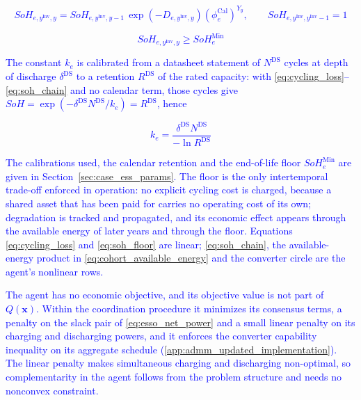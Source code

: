 \documentclass[preprint,12pt]{elsarticle}
\begin{document}
\textcolor{blue}{
    \begin{equation}
        SoH_{e,y^\text{Inv},y} = SoH_{e,y^\text{Inv},y-1} \, \exp\!\left(-D_{e,y^\text{Inv},y}\right)
        \left(\phi^{\text{Cal}}_e\right)^{Y_y},
        \qquad SoH_{e,y^\text{Inv},y^\text{Inv}-1} = 1
        \label{eq:soh_chain}
    \end{equation}
}

\textcolor{blue}{
    \begin{equation}
        SoH_{e,y^\text{Inv},y} \ge SoH^{\text{Min}}_e
        \label{eq:soh_floor}
    \end{equation}
}

\textcolor{blue}{The constant $k_e$ is calibrated from a datasheet statement of $N^{\text{DS}}$ cycles at depth of discharge $\delta^{\text{DS}}$ to a retention $R^{\text{DS}}$ of the rated capacity: with \eqref{eq:cycling_loss}--\eqref{eq:soh_chain} and no calendar term, those cycles give $SoH = \exp(-\delta^{\text{DS}} N^{\text{DS}} / k_e) = R^{\text{DS}}$, hence}

\textcolor{blue}{
    \begin{equation}
        k_e = \frac{\delta^{\text{DS}} N^{\text{DS}}}{-\ln R^{\text{DS}}}
        \label{eq:cycle_life_calibration}
    \end{equation}
}

\noindent
\textcolor{blue}{
    The calibrations used, the calendar retention and the end-of-life floor $SoH^{\text{Min}}_e$ are given in Section~\ref{sec:case_ess_params}. The floor is the only intertemporal trade-off enforced in operation: no explicit cycling cost is charged, because a shared asset that has been paid for carries no operating cost of its own; degradation is tracked and propagated, and its economic effect appears through the available energy of later years and through the floor. 
    Equations \eqref{eq:cycling_loss} and \eqref{eq:soh_floor} are linear; \eqref{eq:soh_chain}, the available-energy product in \eqref{eq:cohort_available_energy} and the converter circle are the agent's nonlinear rows.
}

\textcolor{blue}{
    The agent has no economic objective, and its objective value is not part of $Q(\boldsymbol{x})$. Within the coordination procedure it minimizes its consensus terms, a penalty on the slack pair of \eqref{eq:esso_net_power} and a small linear penalty on its charging and discharging powers, and it enforces the converter capability inequality on its aggregate schedule (\ref{app:admm_updated_implementation}). The linear penalty makes simultaneous charging and discharging non-optimal, so complementarity in the agent follows from the problem structure and needs no nonconvex constraint.
}
\end{document}
